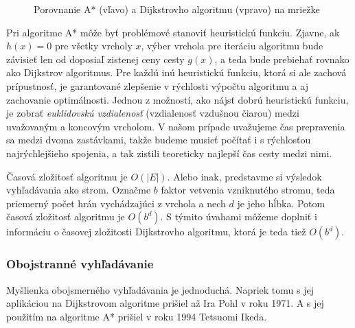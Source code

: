 \begin{figure}[H]
  \caption{Porovnanie A* (vľavo) a Dijkstrovho algoritmu (vpravo) na mriežke}
  \label{AStar_vs_Dijkstra}
\end{figure}

Pri algoritme A* môže byť problémové stanoviť heuristickú funkciu. Zjavne, ak $h(x)=0$ pre všetky vrcholy $x$, výber vrchola pre iteráciu algoritmu bude závisieť len od doposiaľ zistenej ceny cesty $g(x)$, a teda bude prebiehať rovnako ako Dijkstrov algoritmus. Pre každú inú heuristickú funkciu, ktorá si ale zachová prípustnosť, je garantované zlepšenie v rýchlosti výpočtu algoritmu a aj zachovanie optimálnosti. Jednou z možností, ako nájsť dobrú heuristickú funkciu, je zobrať \textit{euklidovskú vzdialenosť} (vzdialenosť vzdušnou čiarou) medzi uvažovaným a koncovým vrcholom. V našom prípade uvažujeme čas prepravenia sa medzi dvoma zastávkami, takže budeme musieť počítať i s rýchlosťou najrýchlejšieho spojenia, a tak zistili teoreticky najlepší čas cesty medzi nimi.\newline

Časová zložitosť algoritmu je $O(|E|)$. Alebo inak, predstavme si výsledok vyhľadávania ako strom. Označme $b$ faktor vetvenia vzniknutého stromu, teda priemerný počet hrán vychádzajúci z vrchola a nech $d$ je jeho hĺbka. Potom časová zložitosť algoritmu je $O(b^{d})$. S týmito úvahami môžeme doplniť i informáciu o časovej zložitosti Dijkstrovho algoritmu, ktorá je teda tiež $O(b^{d})$.\newline


\subsubsection{Obojstranné vyhľadávanie}

Myšlienka obojsmerného vyhľadávania je jednoduchá. Napriek tomu s jej aplikáciou na Dijkstrovom algoritme prišiel až Ira Pohl v roku 1971. A s jej použitím na algoritme A* prišiel v roku 1994 Tetsuomi Ikeda.\newline

